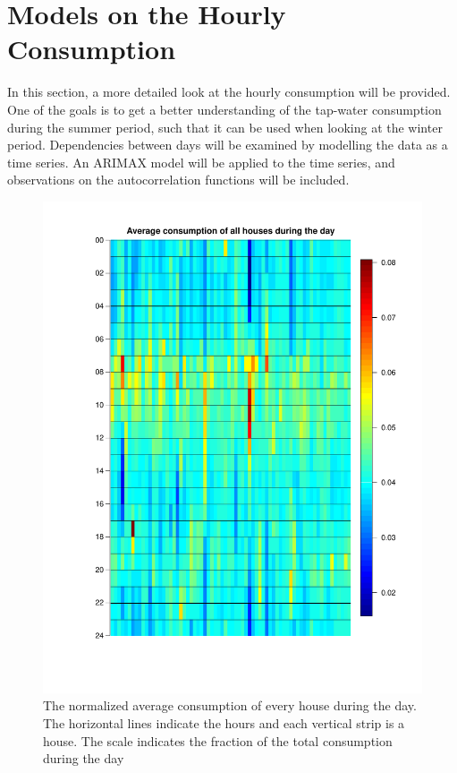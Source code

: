 \chapter{Models on the Hourly Consumption}
In this section, a more detailed look at the hourly consumption will be provided. One of the goals is to get a better understanding of the tap-water consumption during the summer period, such that it can be used when looking at the winter period. Dependencies between days will be examined by modelling the data as a time series. An ARIMAX model will be applied to the time series, and observations on the autocorrelation functions will be included.





\begin{figure}
    \centering
    \includegraphics[width=\textwidth]{../../../figures/Heatmap.pdf}
    \caption{The normalized average consumption of every house during the day. The horizontal lines indicate the hours and each vertical strip is a house. The scale indicates the fraction of the total consumption during the day}
    \label{fig: Hourcons}
\end{figure}


